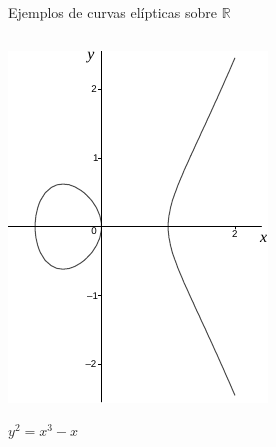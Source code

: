 \documentclass[aspectratio=43,10pt,spanish]{beamer}
\theoremstyle{definition} %
\begin{document}
\begin{frame}{Ejemplos de curvas elípticas sobre $\mathbb{R}$}
        \begin{columns}[T,onlytextwidth]
            \begin{center}
                \includegraphics[width=.9\linewidth]{Graficos/grafo_curva_eliptica_reales_1.pdf}

                $y^2 = x^3 - x$
            \end{center}


\end{columns}
\end{frame}
\end{document}

